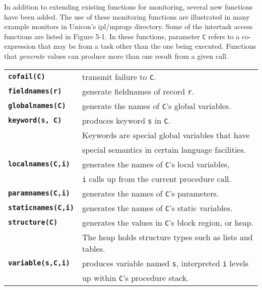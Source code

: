 
In addition to extending existing functions for monitoring,
several new functions have been added.  The use of these monitoring functions
are illustrated in many example monitors in Unicon's
ipl/mprogs directory.  Some of the intertask access functions
are listed in Figure 5-1.  In these functions, parameter {\tt C}
refers to a co-expression that may be from a task other than the one being
executed.  Functions that {\em generate\/}
values can produce more than one result from a given call.

\begin{center}

\begin{tabular}{|ll|} \hline
{\bf\tt cofail(C)}      & transmit failure to {\tt C}. \\
{\bf\tt fieldnames(r)}  & generate fieldnames of record {\tt r}. \\
{\bf\tt globalnames(C)} & generate the names of {\tt C}'s global
variables. \\
{\bf\tt keyword(s, C)} & produces keyword {\tt s} in {\tt C}. \\
	& Keywords are special global variables that have \\
	& special semantics in certain language facilities.\\
{\bf\tt localnames(C,i)} & generates the names of {\tt C}'s local variables,\\
	& {\tt i} calls up from the current procedure call. \\
{\bf\tt paramnames(C,i)} & generates the names of {\tt C}'s parameters. \\
{\bf\tt staticnames(C,i)} & generates the names of {\tt C}'s static variables. \\
{\bf\tt structure(C)} & generates the values in {\tt C}'s block
region, or heap. \\
	 & The heap holds structure types such as lists and tables. \\
{\bf\tt variable(s,C,i)} & produces variable named {\tt s}, interpreted {\tt i} levels\\
	& up within {\tt C}'s procedure stack. \\
\hline
\end{tabular}
\end{center}

